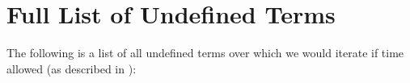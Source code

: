 \chapter{Full List of Undefined Terms}\label{app-undef-terms}

The following is a list of all \the\numexpr\UndefAfter{} undefined terms over
which we would iterate if time allowed (as described in
):

\begin{multicols}{2}
    \raggedright
    \begin{enumerate}
        
    \end{enumerate}
\end{multicols}
